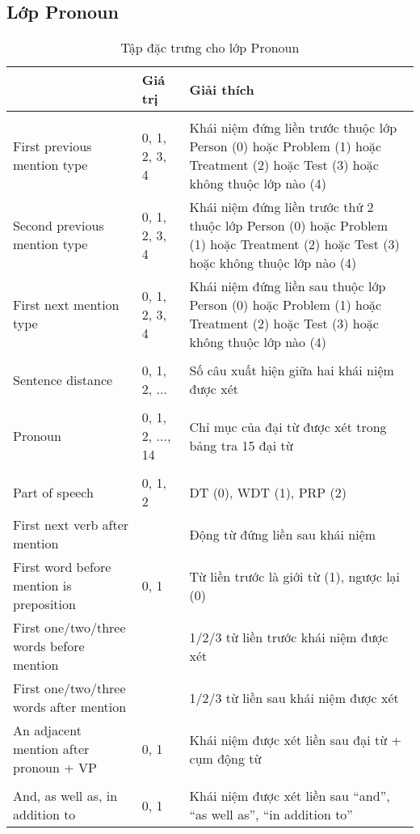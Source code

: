 \subsection*{Lớp Pronoun}
\begin{table}[t!]
\centering{}
\caption{Tập đặc trưng cho lớp Pronoun \label{tab:PronounFeatures}}
\footnotesize\sffamily

\begin{tabularx}{\textwidth}{@{\hspace{1em}}P{\raggedright}{0.3}lL@{}}
\toprule 
{} & \textbf{Giá trị} & \textbf{Giải thích}\\
\midrule
{}\\
First previous mention type & 0, 1, 2, 3, 4 & Khái niệm đứng liền trước thuộc lớp Person (0) hoặc Problem (1) hoặc Treatment (2) hoặc Test (3) hoặc không thuộc lớp nào (4)\\
Second previous mention type & 0, 1, 2, 3, 4 & Khái niệm đứng liền trước thứ 2 thuộc lớp Person (0) hoặc Problem (1) hoặc Treatment (2) hoặc Test (3) hoặc không thuộc lớp nào (4)\\
First next mention type & 0, 1, 2, 3, 4 & Khái niệm đứng liền sau thuộc lớp Person (0) hoặc Problem (1) hoặc Treatment (2) hoặc Test (3) hoặc không thuộc lớp nào (4)\\
\\
Sentence distance & 0, 1, 2, ... & Số câu xuất hiện giữa hai khái niệm được xét\\
\\
Pronoun & 0, 1, 2, ..., 14 & Chỉ mục của đại từ được xét trong bảng tra 15 đại từ\\
\\
Part of speech & 0, 1, 2 & DT (0), WDT (1), PRP (2)\\
First next verb after mention & & Động từ đứng liền sau khái niệm\\
First word before mention is preposition & 0, 1 & Từ liền trước là giới từ (1), ngược lại (0)\\
First one/two/three words before mention & & 1/2/3 từ liền trước khái niệm được xét\\
First one/two/three words after mention & & 1/2/3 từ liền sau khái niệm được xét\\
An adjacent mention after pronoun + VP  & 0, 1 & Khái niệm được xét liền sau đại từ + cụm động từ\\
\\
And, as well as, in addition to & 0, 1 & Khái niệm được xét liền sau ``and'', ``as well as'', ``in addition to''\\
\bottomrule
\end{tabularx}
\end{table}

